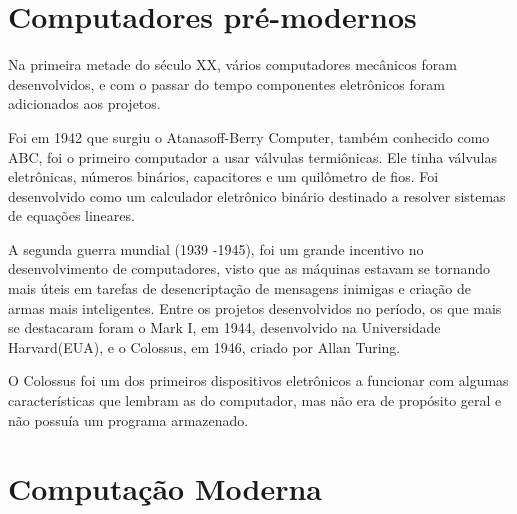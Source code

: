 \documentclass[
	12pt,				%
	openright,			%
	twoside,			%
	a4paper,			%
	english,			%
	french,				%
	spanish,			%
	brazil,				%
	]{abntex2}
\begin{document}
\chapter{Computadores pré-modernos}

Na primeira metade do século XX, vários computadores mecânicos foram desenvolvidos, e com o passar do tempo componentes eletrônicos foram adicionados aos projetos.
\par
Foi em 1942 que surgiu o Atanasoff-Berry Computer, também conhecido como ABC, foi o primeiro computador a usar válvulas termiônicas. Ele tinha válvulas eletrônicas, números binários, capacitores e um quilômetro de fios. Foi desenvolvido como um calculador eletrônico binário destinado a resolver sistemas de equações lineares.
\par
A segunda guerra mundial (1939 -1945), foi um grande incentivo no desenvolvimento de computadores, visto que as máquinas estavam se tornando mais úteis em tarefas de desencriptação de mensagens inimigas e criação de armas mais inteligentes. Entre os projetos desenvolvidos no período, os que mais se destacaram foram o Mark I, em 1944, desenvolvido na Universidade Harvard(EUA), e o Colossus, em 1946, criado por Allan Turing.
\par
O Colossus foi um dos primeiros dispositivos eletrônicos a funcionar com algumas características que lembram as do computador, mas não era de propósito geral e não possuía um programa armazenado.


\chapter{Computação Moderna}
\end{document}
